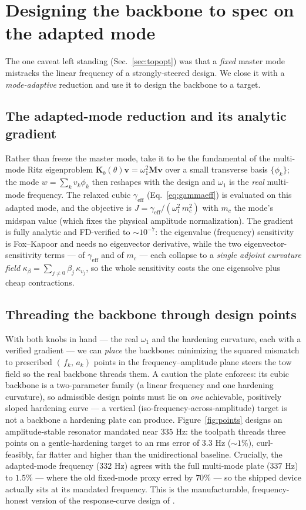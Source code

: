 \documentclass[11pt]{article}
\begin{document}
\section{Designing the backbone to spec on the adapted mode}\label{sec:points}

The one caveat left standing (Sec.~\ref{sec:topopt}) was that a \emph{fixed} master
mode mistracks the linear frequency of a strongly-steered design. We close it with
a \emph{mode-adaptive} reduction and use it to design the backbone to a target.

\subsection{The adapted-mode reduction and its analytic gradient}
Rather than freeze the master mode, take it to be the fundamental of the multi-mode
Ritz eigenproblem $\bm K_b(\theta)\bm v=\omega_1^2\bm M\bm v$ over a small transverse
basis $\{\phi_k\}$; the mode $w=\sum_k v_k\phi_k$ then reshapes with the design and
$\omega_1$ is the \emph{real} multi-mode frequency. The relaxed cubic
$\gamma_{\mathrm{eff}}$ (Eq.~\eqref{eq:gammaeff}) is evaluated on this adapted mode,
and the objective is $J=\gamma_{\mathrm{eff}}/(\omega_1^2\,m_c^2)$ with $m_c$ the
mode's midspan value (which fixes the physical amplitude normalization). The
gradient is fully analytic and FD-verified to $\sim\!10^{-7}$: the eigenvalue
(frequency) sensitivity is Fox--Kapoor and needs no eigenvector derivative, while the
two eigenvector-sensitivity terms --- of $\gamma_{\mathrm{eff}}$ and of $m_c$ ---
each collapse to a \emph{single adjoint curvature field}
$\kappa_\beta=\sum_{j\ne0}\beta_j\,\kappa_{v_j}$, so the whole sensitivity costs the
one eigensolve plus cheap contractions.

\subsection{Threading the backbone through design points}
With both knobs in hand --- the real $\omega_1$ and the hardening curvature, each with
a verified gradient --- we can \emph{place} the backbone: minimizing the squared
mismatch to prescribed $(\,f_k,\,a_k)$ points in the frequency--amplitude plane steers
the tow field so the real backbone threads them. A caution the plate enforces: its
cubic backbone is a two-parameter family (a linear frequency and one hardening
curvature), so admissible design points must lie on \emph{one} achievable, positively
sloped hardening curve --- a vertical (iso-frequency-across-amplitude) target is not a
backbone a hardening plate can produce. Figure~\ref{fig:points} designs an
amplitude-stable resonator mandated near $335$ Hz: the toolpath threads three points
on a gentle-hardening target to an rms error of $3.3$ Hz ($\sim\!1\%$), curl-feasibly,
far flatter and higher than the unidirectional baseline. Crucially, the adapted-mode
frequency ($332$ Hz) agrees with the full multi-mode plate ($337$ Hz) to $1.5\%$ ---
where the old fixed-mode proxy erred by $70\%$ --- so the shipped device actually sits
at its mandated frequency. This is the manufacturable, frequency-honest version of
the response-curve design of \cite{pozzi2025,liang2025}.
\end{document}
